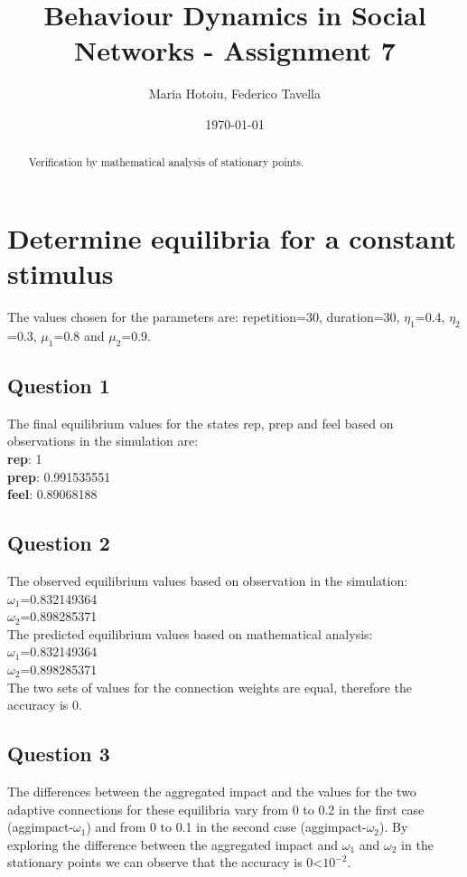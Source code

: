 \documentclass[a4paper]{article}
\title{Behaviour Dynamics in Social Networks - Assignment 7}
\author{Maria Hotoiu, Federico Tavella}
\date{\today}
\begin{document}
\maketitle

\begin{abstract}
Verification by mathematical analysis of stationary points.
\end{abstract}

\section{Determine equilibria for a constant stimulus}

The values chosen for the parameters are: repetition=30, duration=30, $\eta_{1}$=0.4, $\eta_{2}$=0.3, $\mu_{1}$=0.8 and $\mu_{2}$=0.9.

\subsection{Question 1}
The final equilibrium values for the states rep, prep and feel based on observations in the simulation are:\\
\textbf{rep}: 1 \\
\textbf{prep}: 0.991535551	\\
\textbf{feel}: 0.89068188

\subsection{Question 2}

The observed equilibrium values based on observation in the simulation:\\
$\omega_{1}$=0.832149364\\
$\omega_{2}$=0.898285371\\

\noindent 	The predicted equilibrium values based on mathematical analysis: \\
$\omega_{1}$=0.832149364\\
$\omega_{2}$=0.898285371\\

The two sets of values for the connection weights are equal, therefore the accuracy is 0.

\subsection{Question 3}

The differences between the aggregated impact and the values for the two adaptive connections for these equilibria vary from 0 to 0.2 in the first case (aggimpact-$\omega_{1}$) and from 0 to 0.1 in the second case (aggimpact-$\omega_{2}$). 
By exploring the difference between the aggregated impact and $\omega_{1}$ and $\omega_{2}$ in the stationary points we can observe that the accuracy is 0<$10^{-2}$. 
\end{document}
